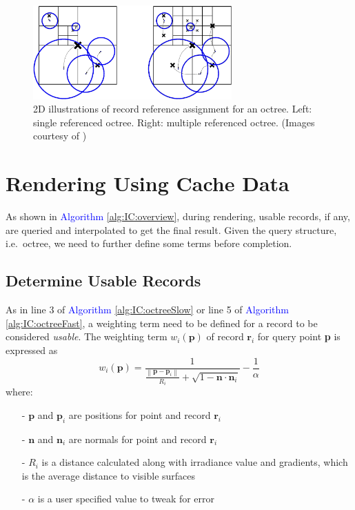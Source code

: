 \documentclass[]{book}
\begin{document}
\begin{figure}[!ht]
	\centering
	\includegraphics[width=3.0in]{img/IC-structure.png}
	\caption[Irradiance Cache Octree]{2D illustrations of record reference assignment for an octree. Left: single referenced octree. Right: multiple referenced octree. (Images courtesy of \citeauthor{ward1992irradiance})}
	\label{fig:IC:octree}
\end{figure}

\section{Rendering Using Cache Data}
\label{sec:IC:usingdata}
As shown in \textcolor{blue}{Algorithm \ref{alg:IC:overview}}, during rendering, usable records, if any, are queried and interpolated to get the final result.
Given the query structure, i.e.\ octree, we need to further define some terms before completion.

\subsection{Determine Usable Records}
\label{sec:IC:usingdata:determine}
As in line 3 of \textcolor{blue}{Algorithm \ref{alg:IC:octreeSlow}} or line 5 of \textcolor{blue}{Algorithm \ref{alg:IC:octreeFast}}, a weighting term need to be defined for a record to be considered \textit{usable}.
The weighting term $w_i(\mathbf{p})$ of record $\mathbf{r}_i$ for query point \textbf{p} is expressed as
\begin{equation}
\label{eq:IC:weight}
	w_i(\mathbf{p})=\frac{1}{\frac{\left \| \mathbf{p} - \mathbf{p}_i \right \|}{R_i} + \sqrt{1-\mathbf{n}\cdot \mathbf{n}_i}}-\frac{1}{\alpha}
\end{equation}
where:
\begin{itemize}
	\item[-] $\mathbf{p}$ and $\mathbf{p}_i$ are positions for point and record $\mathbf{r}_i$
	\item[-] $\mathbf{n}$ and $\mathbf{n}_i$ are normals for point and record $\mathbf{r}_i$
	\item[-] $R_i$ is a distance calculated along with irradiance value and gradients, which is the average distance to visible surfaces
	\item[-] $\alpha$ is a user specified value to tweak for error
\end{itemize}
\end{document}
